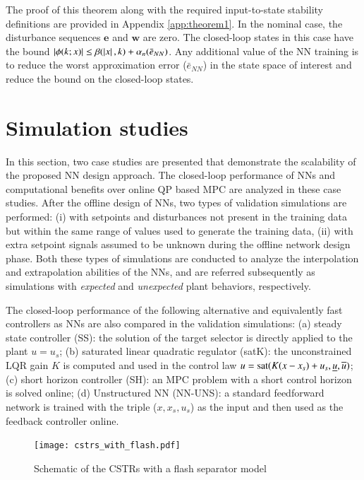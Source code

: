 \documentclass[preprint,5p, twocolumn, authoryear]{elsarticle}
\begin{document}
The proof of this theorem along with the required input-to-state stability
definitions are provided in Appendix \ref{app:theorem1}. In the nominal case,
the disturbance sequences $\mathbf{e}$ and $\mathbf{w}$ are zero. The
closed-loop states in this case have the bound $\left| \phi(k; x) \right| \leq
\beta(\left| x \right|, k) + \alpha_n(\bar{e}_{NN})$. Any additional value of the NN
training is to reduce the worst approximation error ($\bar{e}_{NN}$) in the
state space of interest and reduce the bound on the closed-loop states. 

\section{Simulation studies} \label{sec:simulation_studies}

In this section, two case studies are presented that demonstrate the scalability
of the proposed NN design approach. The closed-loop performance of NNs and
computational benefits over online QP based MPC are analyzed in these case
studies. After the offline design of NNs, two types of validation simulations
are performed: (i) with setpoints and disturbances not present in the training
data but within the same range of values used to generate the training data,
(ii) with extra setpoint signals assumed to be unknown during the offline
network design phase. Both these types of simulations are conducted to analyze
the interpolation and extrapolation abilities of the NNs, and are referred
subsequently as simulations with \textit{expected} and \textit{unexpected} plant
behaviors, respectively.

The closed-loop performance of the following alternative and equivalently fast
controllers as NNs are also compared in the validation simulations: (a) steady
state controller (SS): the solution of the target selector is directly applied
to the plant $u = u_s$; (b) saturated linear quadratic regulator (satK): the
unconstrained LQR gain $K$ is computed and used in the control law $u =
\textnormal{sat}(K(x-x_s) + u_s, \underline{u}, \overline{u})$; (c) short
horizon controller (SH): an MPC problem with a short control horizon is solved
online; (d) Unstructured NN (NN-UNS): a standard feedforward network is trained
with the triple ($x, x_s, u_s$) as the input and then used as the feedback
controller online.

\begin{figure}[h]
    \centering
    \texttt{[image: cstrs\_with\_flash.pdf]}
    \caption{Schematic of the CSTRs with a flash separator model}
    \label{fig:schematic_cstrs}
\end{figure}
\end{document}
